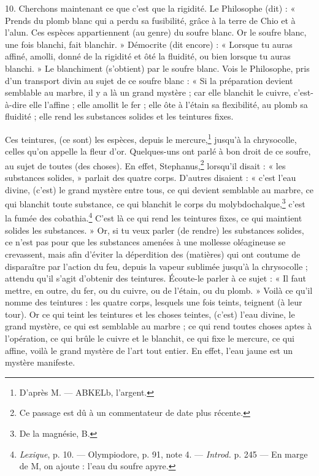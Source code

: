 \documentclass[a4paper, 11pt, oneside, polutonikogreek, french]{article}
\begin{document}
10. Cherchons maintenant ce que c'est que la rigidité. Le Philosophe (dit) : « Prends du plomb blanc qui a perdu sa fusibilité, grâce à la terre de Chio et à l'alun. Ces espèces appartiennent (au genre) du soufre blanc. Or le soufre blanc, une fois blanchi, fait blanchir. » Démocrite (dit encore) : « Lorsque tu auras affiné, amolli, donné de la rigidité et ôté la fluidité, ou bien lorsque tu auras blanchi. » Le blanchiment (s'obtient) par le soufre blanc. Vois le Philosophe, pris d'un transport divin au sujet de ce soufre blanc : « Si la préparation devient semblable au marbre, il y a là un grand mystère ; car elle blanchit le cuivre, c'est-à-dire elle l'affine ; elle amollit le fer ; elle ôte à l'étain sa flexibilité, au plomb sa fluidité ; elle rend les substances solides et les teintures fixes.

Ces teintures, (ce sont) les espèces, depuis le mercure,\footnote{D'après M. --- ABKELb, l'argent.} jusqu'à la chrysocolle, celles qu'on appelle la fleur d'or. Quelques-uns ont parlé à bon droit de ce soufre, au sujet de toutes (des choses). En effet, Stephanus,\footnote{Ce passage est dû à un commentateur de date plus récente.} lorsqu'il disait : « les substances solides, » parlait des quatre corps. D'autres disaient : « c'est l'eau divine, (c'est) le grand mystère entre tous, ce qui devient semblable au marbre, ce qui blanchit toute substance, ce qui blanchit le corps du molybdochalque,\footnote{De la magnésie, B.} c'est la fumée des cobathia.\footnote{\emph{Lexique}, p. 10. --- Olympiodore, p. 91, note 4. --- \emph{Introd.} p. 245 --- En marge de M, on ajoute : l'eau du soufre apyre.} C'est là ce qui rend les teintures fixes, ce qui maintient solides les substances. » Or, si tu veux parler (de rendre) les substances solides, ce n'est pas pour que les substances amenées à une mollesse oléagineuse se crevassent, mais afin d'éviter la déperdition des (matières) qui ont coutume de disparaître par l'action du feu, depuis la vapeur sublimée jusqu'à la chrysocolle ; attendu qu'il s'agit d'obtenir des teintures. Écoute-le parler à ce sujet : « Il faut mettre, en outre, du fer, ou du cuivre, ou de l'étain, ou du plomb. » Voilà ce qu'il nomme des teintures : les quatre corps, lesquels une fois teints, teignent (à leur tour). Or ce qui teint les teintures et les choses teintes, (c'est) l'eau divine, le grand mystère, ce qui est semblable au marbre ; ce qui rend toutes choses aptes à l'opération, ce qui brûle le cuivre et le blanchit, ce qui fixe le mercure, ce qui affine, voilà le grand mystère de l'art tout entier. En effet, l'eau jaune est un mystère manifeste.
\end{document}
